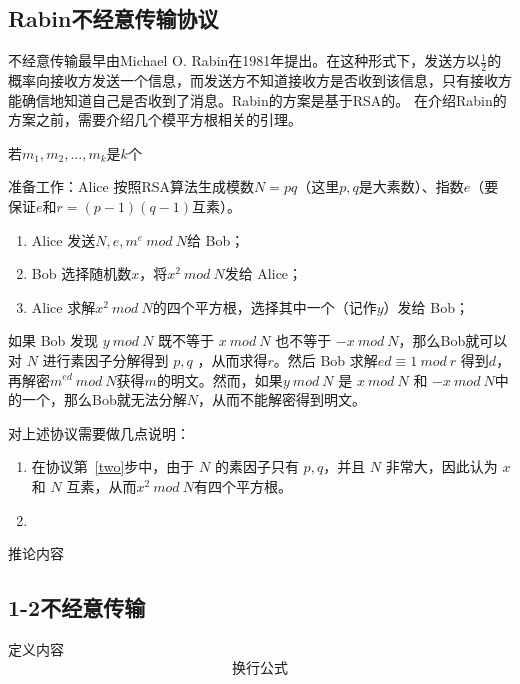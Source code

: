 \documentclass[lang=cn,newtx,10pt,scheme=chinese]{elegantbook}
\begin{document}
\subsection{Rabin不经意传输协议}
不经意传输最早由Michael O. Rabin在1981年提出。在这种形式下，发送方以$\frac{1}{2}$的概率向接收方发送一个信息，而发送方不知道接收方是否收到该信息，只有接收方能确信地知道自己是否收到了消息。Rabin的方案是基于RSA的。
在介绍Rabin的方案之前，需要介绍几个模平方根相关的引理。
\begin{lemma}
	若$m_1,m_2,...,m_k$是$k$个
\end{lemma}
\begin{definition} \label{def:Rabin} 
	准备工作：Alice 按照RSA算法生成模数$N=pq$（这里$p,q$是大素数）、指数$e$（要保证$e$和$r=(p-1)(q-1)$互素）。
\begin{enumerate}
	\item Alice 发送$N,e,m^e\ mod\ N$给 Bob；
	\item\label{two} Bob 选择随机数$x$，将$x^2\ mod\ N$发给 Alice；
	\item Alice 求解$x^2\ mod\ N$的四个平方根，选择其中一个（记作$y$）发给 Bob；
\end{enumerate}
	如果 Bob 发现 $y\ mod\ N$ 既不等于 $x\ mod\ N$ 也不等于 $-x\ mod\ N$，那么Bob就可以对 $N$ 进行素因子分解得到 $p,q$ ，从而求得$r$。然后 Bob 求解$ed\equiv 1\ mod\ r$ 得到$d$，再解密$m^{ed}\ mod\ N$获得$m$的明文。然而，如果$y\ mod\ N$ 是 $x\ mod\ N$ 和 $-x\ mod\ N$中的一个，那么Bob就无法分解$N$，从而不能解密得到明文。
\end{definition}
\begin{remark}
	对上述协议需要做几点说明：
\begin{enumerate}
	\item 在协议第~\ref{two}步中，由于 $N$ 的素因子只有 $p,q$，并且 $N$ 非常大，因此认为 $x$ 和 $N$ 互素，从而$x^2\ mod\ N$有四个平方根。
	\item 
\end{enumerate}
\end{remark}

\begin{corollary}[推论名称] \label{thm:Rabin} 
	推论内容
\end{corollary}


\subsection{1-2不经意传输}


\begin{definition}[定义名称] \label{def:int} 
	定义内容
	\begin{equation}
		换行公式
	\end{equation}
\end{definition}
\end{document}
